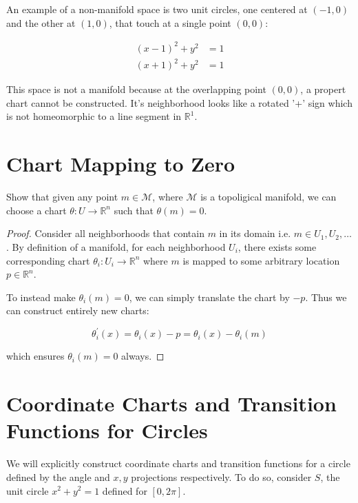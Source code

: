 \documentclass{article}
\begin{document}
    An example of a non-manifold space is two unit circles, one centered at $(-1,0)$ and the other at $(1,0)$, that touch at a single point $(0,0)$:

    \begin{align*}
        (x-1)^2 + y^2 &= 1 \\
        (x+1)^2 + y^2 &= 1
    \end{align*}

    This space is not a manifold because at the overlapping point $(0,0)$, a propert chart cannot be constructed. It's neighborhood looks like a rotated '+' sign which is not homeomorphic to a line segment in $\mathbb{R}^1$.

\section{Chart Mapping to Zero}

    Show that given any point $m \in \mathcal{M}$, where $\mathcal{M}$ is a topoligical manifold, we can choose a chart $\theta : U \rightarrow \mathbb{R}^n$ such that $\theta(m) = 0$.

    \begin{proof}
        Consider all neighborhoods that contain $m$ in its domain i.e. $m \in U_1, U_2, \ldots$. By definition of a manifold, for each neighborhood $U_i$, there exists some corresponding chart $\theta_i : U_i \rightarrow \mathbb{R}^n$ where $m$ is mapped to some arbitrary location $p \in \mathbb{R}^n$.

        To instead make $\theta_i(m) = 0$, we can simply translate the chart by $-p$. Thus we can construct entirely new charts:
        
        \begin{equation*}
            \theta^\prime_i(x) = \theta_i(x) - p = \theta_i(x) - \theta_i(m)
        \end{equation*}

        which ensures $\theta_i(m) = 0 $ always.

    \end{proof}

\section{Coordinate Charts and Transition Functions for Circles}

    We will explicitly construct coordinate charts and transition functions for a circle defined by the angle and $x,y$ projections respectively. To do so, consider $S$, the unit circle $x^2 + y^2 = 1$ defined for $[0, 2 \pi]$.
\end{document}
